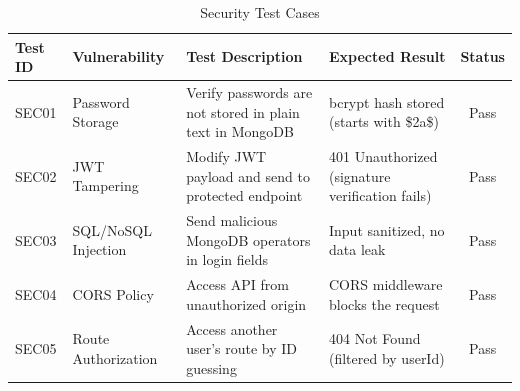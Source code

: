 \begin{table}[H]
    \centering
    \renewcommand{\arraystretch}{1.3}
    \small
    \begin{tabular}{|p{1.2cm}|p{3cm}|p{4.5cm}|p{3cm}|c|}
        \hline
        \textbf{Test ID} & \textbf{Vulnerability} & \textbf{Test Description} & \textbf{Expected Result} & \textbf{Status} \\
        \hline
        SEC01 & Password Storage & Verify passwords are not stored in plain text in MongoDB & bcrypt hash stored (starts with \$2a\$) & Pass \\
        \hline
        SEC02 & JWT Tampering & Modify JWT payload and send to protected endpoint & 401 Unauthorized (signature verification fails) & Pass \\
        \hline
        SEC03 & SQL/NoSQL Injection & Send malicious MongoDB operators in login fields & Input sanitized, no data leak & Pass \\
        \hline
        SEC04 & CORS Policy & Access API from unauthorized origin & CORS middleware blocks the request & Pass \\
        \hline
        SEC05 & Route Authorization & Access another user's route by ID guessing & 404 Not Found (filtered by userId) & Pass \\
        \hline
    \end{tabular}
    \caption{Security Test Cases}
    \label{tab:sec_tests}
\end{table}
